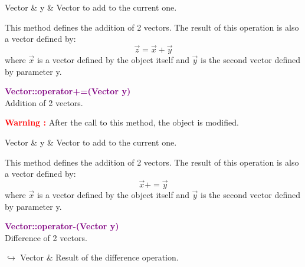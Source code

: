 \begin{tcolorbox}[width=\textwidth,myArgs,tabularx={ll|R}]
Vector & y & Vector to add to the current one.
\end{tcolorbox}

This method defines the addition of 2 vectors.
The result of this operation is also a vector defined by:
\begin{equation*}
\overrightarrow{z}=\overrightarrow{x}+\overrightarrow{y}
\end{equation*}
where $\overrightarrow{x}$ is a vector defined by the object itself and $\overrightarrow{y}$ is the second vector defined by parameter y.

\textcolor{purple}{\textbf{Vector::operator+=(Vector y)}}\label{Vector::operator+=(Vector y)}\\
Addition of 2 vectors.

\hspace*{10mm}\textcolor{red}{\textbf{Warning :}} After the call to this method, the object is modified.

\begin{tcolorbox}[width=\textwidth,myArgs,tabularx={ll|R}]
Vector & y & Vector to add to the current one.
\end{tcolorbox}

This method defines the addition of 2 vectors.
The result of this operation is also a vector defined by:
\begin{equation*}
\overrightarrow{x}+=\overrightarrow{y}
\end{equation*}
where $\overrightarrow{x}$ is a vector defined by the object itself and $\overrightarrow{y}$ is the second vector defined by parameter y.

\textcolor{purple}{\textbf{Vector::operator-(Vector y)}}\label{Vector::operator-(Vector y)}\\
Difference of 2 vectors.\vspace*{-0.5em}
\begin{tcolorbox}[grow to left by=-1cm, width=\textwidth-1cm,myArgs,tabularx={l|R}]
$\hookrightarrow$ Vector & Result of the difference operation.
\end{tcolorbox}

